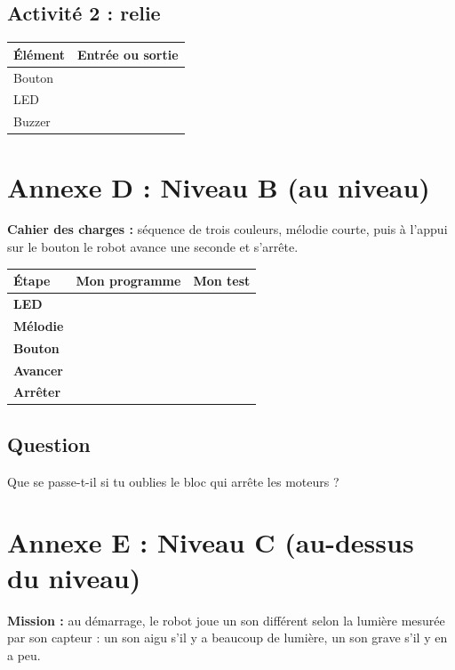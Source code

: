\documentclass[11pt,a4paper]{article}
\begin{document}
\subsection*{Activité 2 : relie}
\begin{tabularx}{\linewidth}{Y Y}
\toprule
\textbf{Élément} & \textbf{Entrée ou sortie}\\
\midrule
Bouton & \\
LED & \\
Buzzer & \\
\bottomrule
\end{tabularx}

\newpage
\section*{Annexe D : Niveau B (au niveau)}

\textbf{Cahier des charges :} séquence de trois couleurs, mélodie courte, puis à l'appui sur le bouton le robot avance une seconde et s'arrête.

\begin{tabularx}{\linewidth}{>{\bfseries}p{2.6cm}Y Y}
\toprule
Étape & Mon programme & Mon test\\
\midrule
LED & & \\
Mélodie & & \\
Bouton & & \\
Avancer & & \\
Arrêter & & \\
\bottomrule
\end{tabularx}

\subsection*{Question}
Que se passe-t-il si tu oublies le bloc qui arrête les moteurs ? \dotfill

\newpage
\section*{Annexe E : Niveau C (au-dessus du niveau)}

\textbf{Mission :} au démarrage, le robot joue un son différent selon la lumière mesurée par son capteur : un son aigu s'il y a beaucoup de lumière, un son grave s'il y en a peu.
\end{document}
